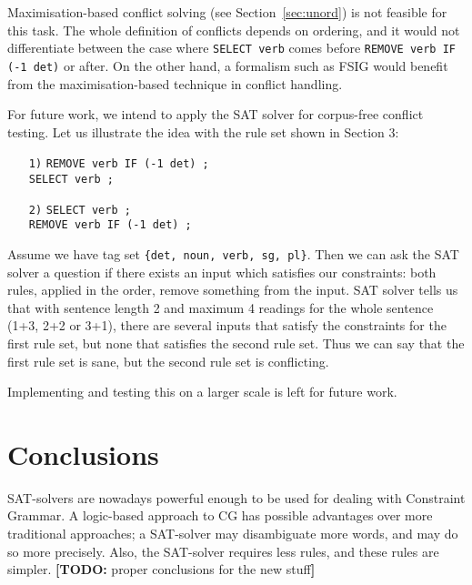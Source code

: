 \documentclass[11pt]{article}
\newcommand{\todo}[1]{{\color{cyan}\textbf{[TODO: }#1\textbf{]}}}
\begin{document}
Maximisation-based conflict solving (see Section~\ref{sec:unord}) is not feasible for this task. 
The whole definition of conflicts depends on ordering, and it would
not differentiate between the case where \texttt{SELECT verb} comes
before \texttt{REMOVE verb IF (-1 det)} or after.
On the other hand, a formalism such as FSIG would benefit from the
maximisation-based technique in conflict handling.

For future work, we intend to apply the SAT solver for corpus-free
conflict testing. Let us illustrate the idea with the rule
set shown in Section 3:


\begin{itemize}
\item [\texttt{1)}] \texttt{REMOVE verb IF (-1 det) ;} \\
         \texttt{SELECT verb ;}

\item [\texttt{2)}] \texttt{SELECT verb ;} \\
         \texttt{REMOVE verb IF (-1 det) ;} 
\end{itemize}

Assume we have tag set \texttt{\{det, noun, verb, sg, pl\}}. Then we
can ask the SAT solver a question if there exists an input which
satisfies our constraints: both rules, applied in the order, remove
something from the input.
SAT solver tells us that with sentence length 2 and maximum 4 readings
for the whole sentence (1+3, 2+2 or 3+1), there are several inputs that
satisfy the constraints for the first rule set, but none that
satisfies the second rule set. Thus we can say that the first rule set
is sane, but the second rule set is conflicting.

Implementing and testing this on a larger scale is left for future work.



\section{Conclusions}

SAT-solvers are nowadays powerful enough to be used for dealing with
Constraint Grammar. A logic-based approach to CG has possible
advantages over more traditional approaches; a SAT-solver may
disambiguate more words, and may do so more precisely. Also, the
SAT-solver requires less rules, and these rules are simpler. 
\todo{proper conclusions for the new stuff}
\end{document}
